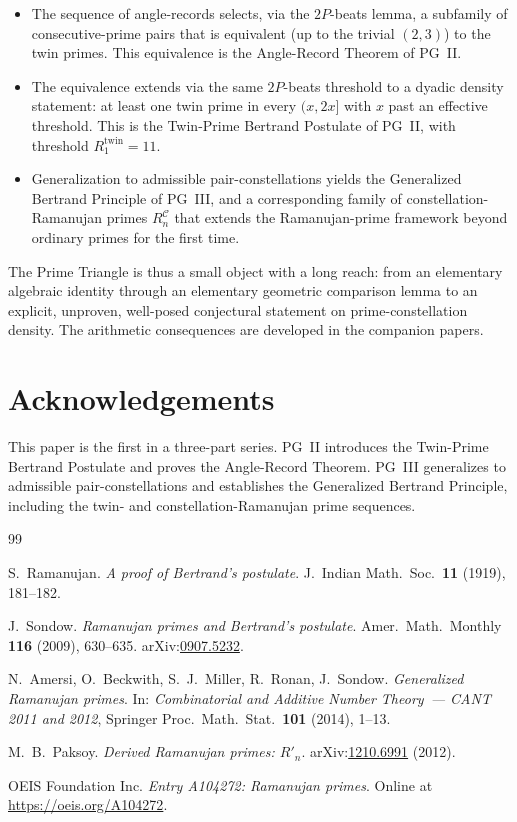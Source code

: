 \documentclass[11pt]{article}
\begin{document}
\begin{itemize}
\item The sequence of angle-records selects, via the $2P$-beats
lemma, a subfamily of consecutive-prime pairs that is equivalent
(up to the trivial $(2, 3)$) to the twin primes. This equivalence
is the Angle-Record Theorem of PG~II.
\item The equivalence extends via the same $2P$-beats threshold to
a dyadic density statement: at least one twin prime in every
$(x, 2x]$ with $x$ past an effective threshold. This is the
Twin-Prime Bertrand Postulate of PG~II, with threshold
$R^{\mathrm{twin}}_1 = 11$.
\item Generalization to admissible pair-constellations yields the
Generalized Bertrand Principle of PG~III, and a corresponding
family of constellation-Ramanujan primes $R^{\mathcal{C}}_n$ that
extends the Ramanujan-prime framework beyond ordinary primes for
the first time.
\end{itemize}

The Prime Triangle is thus a small object with a long reach: from
an elementary algebraic identity through an elementary geometric
comparison lemma to an explicit, unproven, well-posed conjectural
statement on prime-constellation density. The arithmetic
consequences are developed in the companion papers.

\section*{Acknowledgements}

This paper is the first in a three-part series. PG~II introduces
the Twin-Prime Bertrand Postulate and proves the Angle-Record
Theorem. PG~III generalizes to admissible pair-constellations and
establishes the Generalized Bertrand Principle, including the
twin- and constellation-Ramanujan prime sequences.

\begin{thebibliography}{99}

S.~Ramanujan.
\emph{A proof of Bertrand's postulate}.
J.~Indian Math.\ Soc.\ \textbf{11} (1919), 181--182.

J.~Sondow.
\emph{Ramanujan primes and Bertrand's postulate}.
Amer.\ Math.\ Monthly \textbf{116} (2009), 630--635.
arXiv:\href{https://arxiv.org/abs/0907.5232}{0907.5232}.

N.~Amersi, O.~Beckwith, S.~J.~Miller, R.~Ronan, J.~Sondow.
\emph{Generalized Ramanujan primes}.
In: \emph{Combinatorial and Additive Number Theory~--- CANT 2011 and 2012},
Springer Proc.\ Math.\ Stat.\ \textbf{101} (2014), 1--13.

M.~B.~Paksoy.
\emph{Derived Ramanujan primes: $R'_n$}.
arXiv:\href{https://arxiv.org/abs/1210.6991}{1210.6991} (2012).

OEIS Foundation Inc.
\emph{Entry A104272: Ramanujan primes}.
Online at \url{https://oeis.org/A104272}.

\end{thebibliography}
\end{document}
